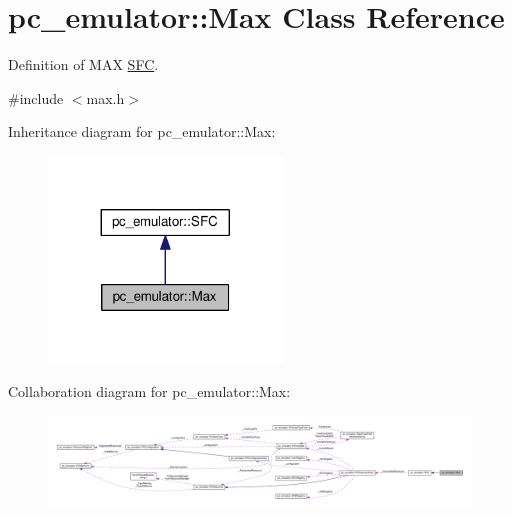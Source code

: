 \hypertarget{classpc__emulator_1_1Max}{}\section{pc\+\_\+emulator\+:\+:Max Class Reference}
\label{classpc__emulator_1_1Max}


Definition of M\+AX \hyperlink{classpc__emulator_1_1SFC}{S\+FC}.  




{\ttfamily \#include $<$max.\+h$>$}



Inheritance diagram for pc\+\_\+emulator\+:\+:Max\+:\nopagebreak
\begin{figure}[H]
\begin{center}
\leavevmode
\includegraphics[width=176pt]{classpc__emulator_1_1Max__inherit__graph}
\end{center}
\end{figure}


Collaboration diagram for pc\+\_\+emulator\+:\+:Max\+:\nopagebreak
\begin{figure}[H]
\begin{center}
\leavevmode
\includegraphics[width=350pt]{classpc__emulator_1_1Max__coll__graph}
\end{center}
\end{figure}
